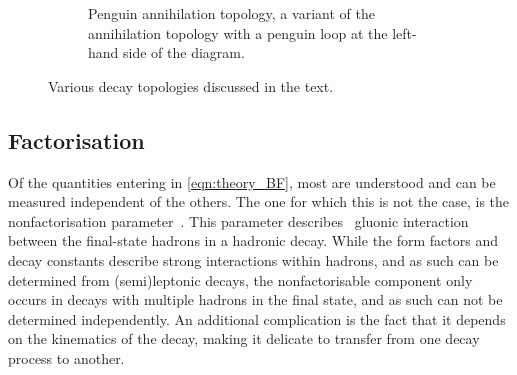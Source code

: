 \begin{figure}[hp]
\begin{subfigure}{\textwidth}
        \caption{
            Penguin annihilation topology, a variant of the annihilation topology with a penguin loop at the left-hand side of the diagram.}
        \label{fig:theory_Topologies_PenguinAnnihilation}
    \end{subfigure}
    \caption{Various decay topologies discussed in the text.}
\end{figure}

\clearpage
\subsection{Factorisation}

Of the quantities entering in \cref{eqn:theory_BF}, most are understood and can be measured independent of the others.
The one for which this is not the case, is the nonfactorisation parameter~\aNF.
This parameter describes \eg~gluonic interaction between the final-state hadrons in a hadronic decay.
While the form factors and decay constants describe strong interactions within hadrons, and as such can be determined from (semi)leptonic decays, the nonfactorisable component only occurs in decays with multiple hadrons in the final state, and as such can not be determined independently.
An additional complication is the fact that it depends on the kinematics of the decay, making it delicate to transfer from one decay process to another.

